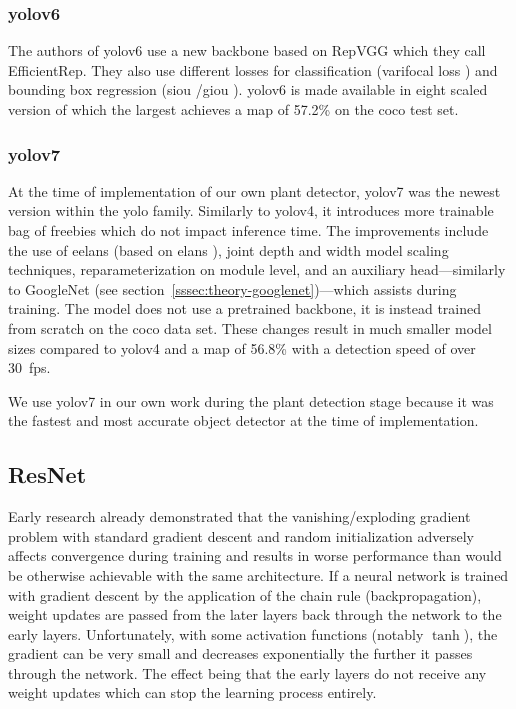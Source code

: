 \documentclass[draft,final]{vutinfth} %
\begin{document}
\subsubsection{\gls{yolo}v6}
\label{sssec:yolov6}

The authors of \gls{yolo}v6 \cite{li2022a} use a new backbone based on
RepVGG \cite{ding2021} which they call EfficientRep. They also use
different losses for classification (varifocal loss \cite{zhang2021})
and bounding box regression (\gls{siou}
\cite{gevorgyan2022}/\gls{giou} \cite{rezatofighi2019}). \gls{yolo}v6
is made available in eight scaled version of which the largest
achieves a \gls{map} of 57.2\% on the \gls{coco} test set.

\subsubsection{\gls{yolo}v7}
\label{sssec:yolov7}

At the time of implementation of our own plant detector, \gls{yolo}v7
\cite{wang2022} was the newest version within the \gls{yolo}
family. Similarly to \gls{yolo}v4, it introduces more trainable bag of
freebies which do not impact inference time. The improvements include
the use of \glspl{eelan} (based on \glspl{elan} \cite{wang2022a}),
joint depth and width model scaling techniques, reparameterization on
module level, and an auxiliary head---similarly to GoogleNet (see
section~\ref{sssec:theory-googlenet})---which assists during
training. The model does not use a pretrained backbone, it is instead
trained from scratch on the \gls{coco} data set. These changes result
in much smaller model sizes compared to \gls{yolo}v4 and a \gls{map}
of 56.8\% with a detection speed of over \qty{30}{fps}.

We use \gls{yolo}v7 in our own work during the plant detection stage
because it was the fastest and most accurate object detector at the
time of implementation.

\subsection{ResNet}
\label{sec:methods-classification}

Early research \cite{bengio1994,glorot2010} already demonstrated that
the vanishing/exploding gradient problem with standard gradient
descent and random initialization adversely affects convergence during
training and results in worse performance than would be otherwise
achievable with the same architecture. If a neural network is trained
with gradient descent by the application of the chain rule
(backpropagation), weight updates are passed from the later layers
back through the network to the early layers. Unfortunately, with some
activation functions (notably $\tanh$), the gradient can be very small
and decreases exponentially the further it passes through the
network. The effect being that the early layers do not receive any
weight updates which can stop the learning process entirely.
\end{document}

